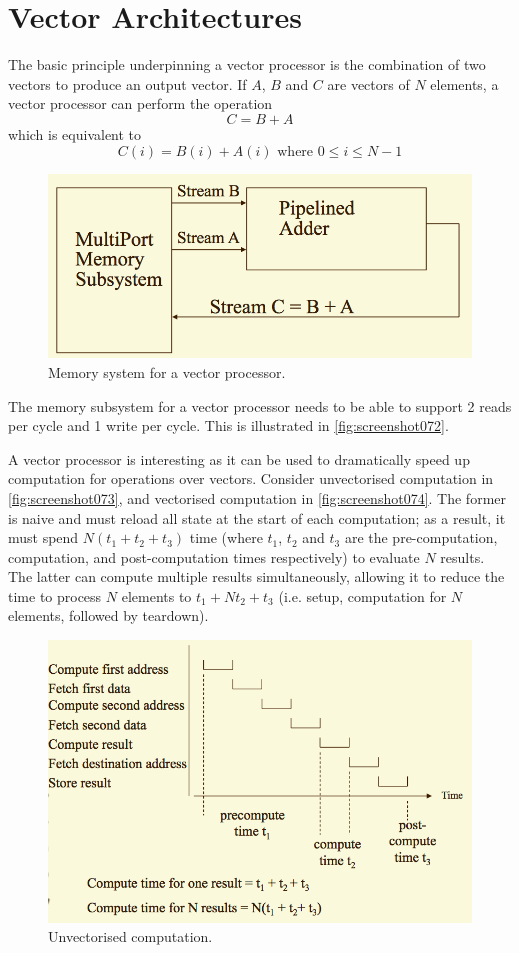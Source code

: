 \chapter{Vector Architectures}
The basic principle underpinning a vector processor is the combination of two vectors to produce an output vector. If $A$, $B$ and $C$ are vectors of $N$ elements, a vector processor can perform the operation
\[ C = B + A \]
which is equivalent to
\[ C(i) = B(i) + A(i) \text{ where } 0 \le i \le N-1 \]

\begin{figure}
\centering
\includegraphics[width=0.7\linewidth]{figures/screenshot072}
\caption{Memory system for a vector processor.}
\label{fig:screenshot072}
\end{figure}

The memory subsystem for a vector processor needs to be able to support 2 reads per cycle and 1 write per cycle. This is illustrated in \autoref{fig:screenshot072}.

A vector processor is interesting as it can be used to dramatically speed up computation for operations over vectors. Consider unvectorised computation in \autoref{fig:screenshot073}, and vectorised computation in \autoref{fig:screenshot074}. The former is naive and must reload all state at the start of each computation; as a result, it must spend $N(t_1 + t_2 + t_3)$ time (where $t_1$, $t_2$ and $t_3$ are the pre-computation, computation, and post-computation times respectively) to evaluate $N$ results. The latter can compute multiple results simultaneously, allowing it to reduce the time to process $N$ elements to $t_1 + Nt_2 + t_3$ (i.e. setup, computation for $N$ elements, followed by teardown).

\begin{figure}
\centering
\includegraphics[width=0.7\linewidth]{figures/screenshot073}
\caption{Unvectorised computation.}
\label{fig:screenshot073}
\end{figure}

